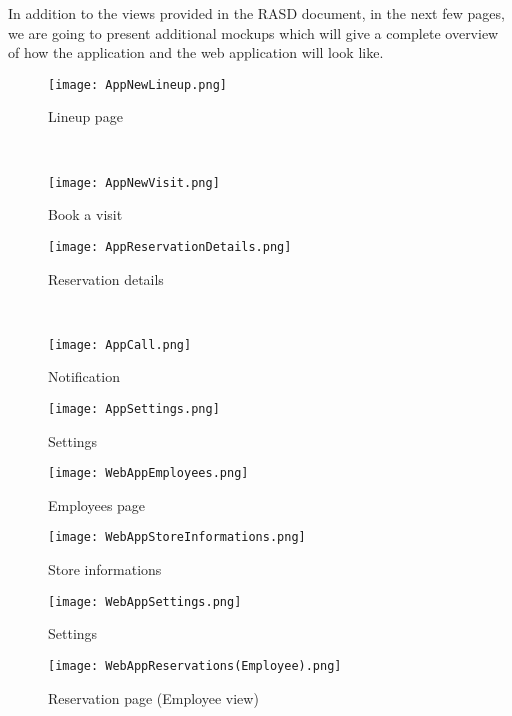 In addition to the views provided in the RASD document, in the next few pages, we are going to present additional mockups which will give a complete overview of how the application and the web application will look like.

\begin{figure}[H]
    \begin{minipage}[b]{8cm}
    \centering
    \texttt{[image: AppNewLineup.png]}
    \caption{Lineup page}
    \end{minipage}
    \ \hspace{2mm} \hspace{3mm} \
    \begin{minipage}[b]{8cm}
    \centering
    \texttt{[image: AppNewVisit.png]}
    \caption{Book a visit}
    \end{minipage}
\end{figure}

\begin{figure}[H]
    \begin{minipage}[b]{8cm}
    \centering
    \texttt{[image: AppReservationDetails.png]}
    \caption{Reservation details}
    \end{minipage}
    \ \hspace{2mm} \hspace{3mm} \
    \begin{minipage}[b]{8cm}
    \centering
    \texttt{[image: AppCall.png]}
    \caption{Notification}
    \end{minipage}
\end{figure}

\begin{figure}[H]
    \centering
    \texttt{[image: AppSettings.png]}
    \caption{Settings}
\end{figure}

\begin{figure}[H]
    \centering
    \texttt{[image: WebAppEmployees.png]}
    \caption{Employees page}
\end{figure}

\begin{figure}[H]
    \centering
    \texttt{[image: WebAppStoreInformations.png]}
    \caption{Store informations}
\end{figure}

\begin{figure}[H]
    \centering
    \texttt{[image: WebAppSettings.png]}
    \caption{Settings}
\end{figure}

\begin{figure}[H]
    \centering
    \texttt{[image: WebAppReservations(Employee).png]}
    \caption{Reservation page (Employee view)}
\end{figure}